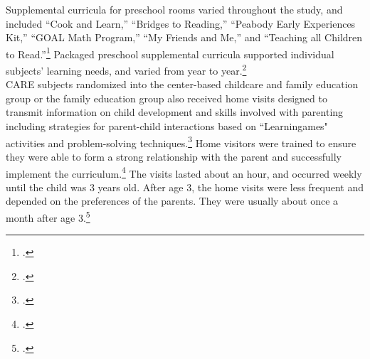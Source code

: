 \begin{appendices}
\noindent Supplemental curricula for preschool rooms varied throughout the study, and included ``Cook and Learn,'' ``Bridges to Reading,'' ``Peabody Early Experiences Kit,'' ``GOAL Math Program,'' ``My Friends and Me,'' and ``Teaching all Children to Read.''\footnote{ \citet{Greenberg_Epstein_1973_BOOKBridgestoreading,Karnes1973,Dunn_Chun_etal_1976_BOOKPeabodyearlyeducation,Davis_1977_BOOKMyfriends,Wallach_1976_Teaching-All-Children}.} Packaged preschool supplemental curricula supported individual subjects' learning needs, and varied from year to year.\footnote{ \citet{Ramey_McGinness_etal_1982_Abecedarianapproach,Mcginness_1981_Developing,Finkelstein_1982_Day_Care_YC,Wasik_Ramey_etal_1990_CD}.}\\

\noindent CARE subjects randomized into the center-based childcare and family education group or the family education group also received home visits designed to transmit information on child development and skills involved with parenting including strategies for parent-child interactions based on ``Learningames" activities and problem-solving techniques.\footnote{\citet{Bryant_et_al_1987_Carolina_Approach_TIECSE, Wasik_Ramey_etal_1990_CD, Burchinal_Campbell_etal_1997_CD}.} Home visitors were trained to ensure they were able to form a strong relationship with the parent and successfully implement the curriculum.\footnote{\citet{Bryant_et_al_1987_Carolina_Approach_TIECSE}.} The visits lasted about an hour, and occurred weekly until the child was 3 years old. After age 3, the home visits were less frequent and depended on the preferences of the parents. They were usually about once a month after age 3.\footnote{\citet{Bryant_et_al_1987_Carolina_Approach_TIECSE, Wasik_Ramey_etal_1990_CD, Burchinal_Campbell_etal_1997_CD}.} 


\end{appendices}
